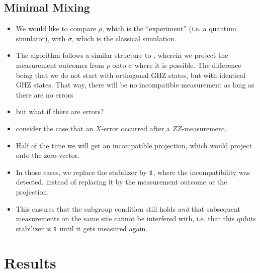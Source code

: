 \subsection{Minimal Mixing}\label{sec:minimal-mixing}
\begin{itemize}
  \item We would like to compare $\rho$, which is the \enquote{experiment}
    (i.e. a quantum simulator), with $\sigma$, which is the classical
    simulation.
  \item The algorithm follows a similar structure to
    \cite{liCrossEntropyBenchmark2023}, wherein we project the measurement
    outcomes from $\rho$ onto $\sigma$ where it is possible. The difference
    being that we do not start with orthogonal GHZ states, but with identical
    GHZ states. That way, there will be no incompatible measurement as long as
    there are no errors
  \item but what if there are errors?
  \item consider the case that an $X$-error occurred after a $ZZ$-measurement.
  \item Half of the time we will get an incompatible projection, which would
    project onto the zero-vector.
  \item In those cases, we replace the stabilizer by $\mathds{1}$, where the
    incompatibility was detected, instead of replacing it by the measurement
    outcome or the projection.
  \item This ensures that the subgroup condition still holds \emph{and} that
    subsequent measurements on the same site cannot be interfered with, i.e.
    that this qubits stabilizer is $\mathds{1}$ until it gets measured again.
\end{itemize}
\section{Results}
